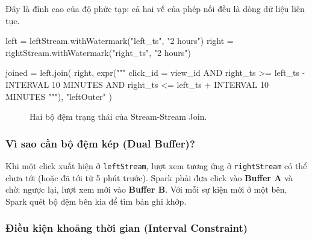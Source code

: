 \documentclass[12pt]{article}
\begin{document}
Đây là đỉnh cao của độ phức tạp: cả hai vế của phép nối đều là dòng dữ liệu liên tục.

\begin{aivnpybox}
left = leftStream.withWatermark("left_ts", "2 hours")
right = rightStream.withWatermark("right_ts", "2 hours")

joined = left.join(
    right,
    expr("""
        click_id = view_id AND
        right_ts >= left_ts - INTERVAL 10 MINUTES AND
        right_ts <= left_ts + INTERVAL 10 MINUTES
    """),
    "leftOuter"
)
\end{aivnpybox}

\begin{figure}[H]
\centering
{}
\caption{Hai bộ đệm trạng thái của Stream-Stream Join.}
\label{fig:ss-join}
\end{figure}

\subsubsection{Vì sao cần bộ đệm kép (Dual Buffer)?}

Khi một click xuất hiện ở \texttt{leftStream}, lượt xem tương ứng ở \texttt{rightStream} có thể chưa tới (hoặc đã tới từ 5 phút trước). Spark phải đưa click vào \textbf{Buffer A} và chờ; ngược lại, lượt xem mới vào \textbf{Buffer B}. Với mỗi sự kiện mới ở một bên, Spark quét bộ đệm bên kia để tìm bản ghi khớp.

\subsubsection{Điều kiện khoảng thời gian (Interval Constraint)}
\end{document}
